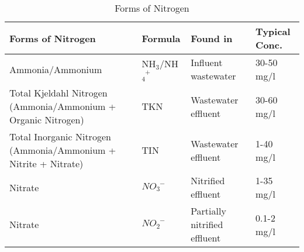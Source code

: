 					      \begin{center}
					      \begin{table}[!htbp]
					      	\noindent \begin{tabular}[!htbp]{ |p{6cm}|p{2.0cm}|p{2.5cm}|p{}|}
					      	\hline
					      	
					      	\hspace{1.8 cm}Forms of Nitrogen & \hspace{0.25 cm} Formula & \hspace{.4 cm} Found in & \hspace{.4 cm} Typical \newline \hspace{.2 cm}Conc.\\
					      	\hline
					      	\small Ammonia/Ammonium & \small NH$_3$/NH$_4^{\enspace +}$ &  \small Influent wastewater & 30-50 mg/l\\
					      	
					      	Total Kjeldahl Nitrogen \newline  \small (Ammonia/Ammonium + Organic Nitrogen) &  \small TKN &  \small Wastewater \newline  \small effluent  & 30-60 mg/l \\
					      	
					      	\small Total Inorganic Nitrogen \newline  \small (Ammonia/Ammonium + Nitrite + Nitrate) & \small TIN &  \small  Wastewater \newline  \small effluent  & 1-40 mg/l \\
					      	
					      	\small Nitrate  & $NO_3^{\enspace -}$ &  \small Nitrified effluent &  \small 1-35 mg/l \\
					      	
					      	\small Nitrate  &  $NO_2^{\enspace -}$ &  \small Partially nitrified effluent &  \small 0.1-2 mg/l \\
					      	
					      	\hline
					      	\end{tabular}
					      	\caption{Forms of Nitrogen}
					      	\end{table}
					      \end{center}
				      
